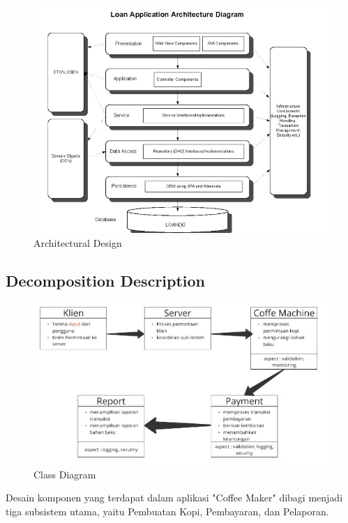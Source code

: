 \documentclass[12pt]{article}
\begin{document}
\begin{figure}[tbh]
\centering
\includegraphics[width=0.7\linewidth]{./img/image}
\caption{Architectural Design}
\label{fig:image}
\end{figure}

\subsection{Decomposition Description}

\begin{figure}[tbh]
\centering
\includegraphics[width=0.7\linewidth]{./img/class_diagram.jpg}
\caption{Class Diagram}
\label{fig:image2}
\end{figure}

Desain komponen yang terdapat dalam aplikasi "Coffee Maker" dibagi menjadi tiga subsistem utama, yaitu Pembuatan Kopi, Pembayaran, dan Pelaporan.
\end{document}
